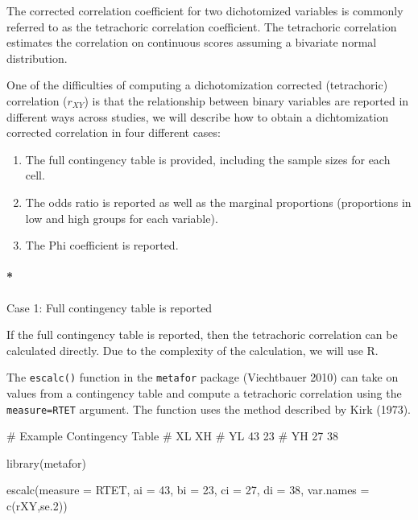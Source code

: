 \documentclass[
  letterpaper,
  DIV=11,
  numbers=noendperiod]{scrreprt}
\let\oldparagraph\paragraph
\renewcommand{\paragraph}[1]{\oldparagraph{#1}\mbox{}}
\newenvironment{Shaded}{}{}
\newcommand{\AttributeTok}[1]{\textcolor[rgb]{0.00,0.34,0.68}{#1}}
\newcommand{\CommentTok}[1]{\textcolor[rgb]{0.54,0.53,0.53}{#1}}
\newcommand{\DecValTok}[1]{\textcolor[rgb]{0.69,0.50,0.00}{#1}}
\newcommand{\FunctionTok}[1]{\textcolor[rgb]{0.39,0.29,0.61}{#1}}
\newcommand{\NormalTok}[1]{\textcolor[rgb]{0.12,0.11,0.11}{#1}}
\newcommand{\StringTok}[1]{\textcolor[rgb]{0.75,0.01,0.01}{#1}}
\providecommand{\tightlist}{%
  \setlength{\itemsep}{0pt}\setlength{\parskip}{0pt}}\usepackage{longtable,booktabs,array}
\begin{document}
The corrected correlation coefficient for two dichotomized variables is
commonly referred to as the tetrachoric correlation coefficient. The
tetrachoric correlation estimates the correlation on continuous scores
assuming a bivariate normal distribution.

One of the difficulties of computing a dichotomization corrected
(tetrachoric) correlation (\(r_{XY}\)) is that the relationship between
binary variables are reported in different ways across studies, we will
describe how to obtain a dichtomization corrected correlation in four
different cases:

\begin{enumerate}
\def\labelenumi{\arabic{enumi}.}
\tightlist
\item
  The full contingency table is provided, including the sample sizes for
  each cell.
\item
  The odds ratio is reported as well as the marginal proportions
  (proportions in low and high groups for each variable).
\item
  The Phi coefficient is reported.
\end{enumerate}

\hypertarget{case-1-full-contingency-table-is-reported}{%
\paragraph*{Case 1: Full contingency table is
reported}\label{case-1-full-contingency-table-is-reported}}

If the full contingency table is reported, then the tetrachoric
correlation can be calculated directly. Due to the complexity of the
calculation, we will use R.

The \texttt{escalc()} function in the \texttt{metafor} package
(Viechtbauer 2010) can take on values from a contingency table and
compute a tetrachoric correlation using the
\texttt{measure=\textquotesingle{}RTET\textquotesingle{}} argument. The
function uses the method described by Kirk (1973).

\begin{Shaded}
\begin{Highlighting}[]
\CommentTok{\# Example Contingency Table}
\CommentTok{\#    XL   XH}
\CommentTok{\# YL 43   23}
\CommentTok{\# YH 27   38  }

\FunctionTok{library}\NormalTok{(metafor)}

\FunctionTok{escalc}\NormalTok{(}\AttributeTok{measure =} \StringTok{\textquotesingle{}RTET\textquotesingle{}}\NormalTok{,}
       \AttributeTok{ai =} \DecValTok{43}\NormalTok{,}
       \AttributeTok{bi =} \DecValTok{23}\NormalTok{,}
       \AttributeTok{ci =} \DecValTok{27}\NormalTok{,}
       \AttributeTok{di =} \DecValTok{38}\NormalTok{,}
       \AttributeTok{var.names =} \FunctionTok{c}\NormalTok{(}\StringTok{\textquotesingle{}rXY\textquotesingle{}}\NormalTok{,}\StringTok{\textquotesingle{}se.2\textquotesingle{}}\NormalTok{))}
\end{Highlighting}
\end{Shaded}
\end{document}
